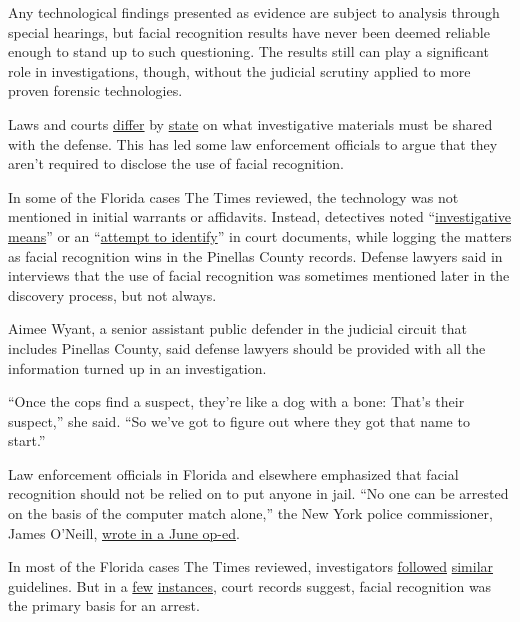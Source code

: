 Any technological findings presented as evidence are subject to analysis
through special hearings, but facial recognition results have never been
deemed reliable enough to stand up to such questioning. The results
still can play a significant role in investigations, though, without the
judicial scrutiny applied to more proven forensic technologies.

Laws and courts
\href{https://law.justia.com/cases/new-jersey/appellate-division-published/1992/254-n-j-super-754-1.html}{differ}
by \href{http://fprints.nwlean.net/Brady.pdf}{state} on what
investigative materials must be shared with the defense. This has led
some law enforcement officials to argue that they aren't required to
disclose the use of facial recognition.

In some of the Florida cases The Times reviewed, the technology was not
mentioned in initial warrants or affidavits. Instead, detectives noted
``\href{https://www.documentcloud.org/documents/6586485-Kohlsshoplifting-Redacted.html}{investigative
means}'' or an
``\href{https://www.documentcloud.org/documents/6591394-PasadenaLiquors-Redacted.html}{attempt
to identify}'' in court documents, while logging the matters as facial
recognition wins in the Pinellas County records. Defense lawyers said in
interviews that the use of facial recognition was sometimes mentioned
later in the discovery process, but not always.

Aimee Wyant, a senior assistant public defender in the judicial circuit
that includes Pinellas County, said defense lawyers should be provided
with all the information turned up in an investigation.

``Once the cops find a suspect, they're like a dog with a bone: That's
their suspect,'' she said. ``So we've got to figure out where they got
that name to start.''

Law enforcement officials in Florida and elsewhere emphasized that
facial recognition should not be relied on to put anyone in jail. ``No
one can be arrested on the basis of the computer match alone,'' the New
York police commissioner, James O'Neill,
\href{https://www.nytimes.com/2019/06/09/opinion/facial-recognition-police-new-york-city.html}{wrote
in a June op-ed}.

In most of the Florida cases The Times reviewed, investigators
\href{https://www.documentcloud.org/documents/6591395-Armedrobbery-Redacted.html}{followed}
\href{https://www.documentcloud.org/documents/6591396-Shoes-Redacted.html}{similar}
guidelines. But in a
\href{https://www.documentcloud.org/documents/6586485-Kohlsshoplifting-Redacted.html}{few}
\href{https://www.documentcloud.org/documents/6587265-Shoesshoplifting-Redacted.html}{instances},
court records suggest, facial recognition was the primary basis for an
arrest.

